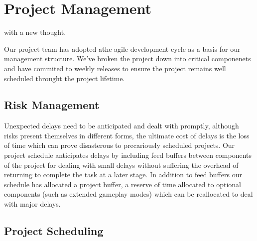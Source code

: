 \chapter[Project Management]{Project Management}
\label{ch:management}


 with a new thought.

Our project team has adopted athe agile development cycle as a basis for our management structure. We've broken the project down into critical componenets and have commited to weekly releases to ensure the project remains well scheduled throught the project lifetime.

\section{Risk Management}
Unexpected delays need to be anticipated and dealt with promptly, although risks present themselves in different forms, the ultimate cost of delays is the loss of time which can prove disasterous to precariously scheduled projects. Our project schedule anticipates delays by including feed buffers between components of the project for dealing with small delays without suffering the overhead of returning to complete the task at a later stage. In addition to feed buffers our schedule has allocated a project buffer, a reserve of time allocated to optional components (such as extended gameplay modes) which can be reallocated to deal with major delays.

\section{Project Scheduling}

